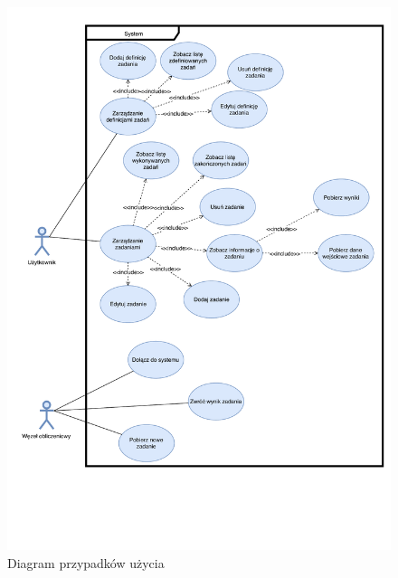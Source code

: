 \documentclass[a4paper,11pt,twoside]{report}
\theoremstyle{definition}
\begin{document}
            \begin{figure}
                \centering
                \includegraphics[width=\textwidth,height=\textheight,keepaspectratio]{images/use-cases.pdf}
                \caption{Diagram przypadków użycia}
                \label{use-cases-diagram}
            \end{figure}
        
\end{document}
